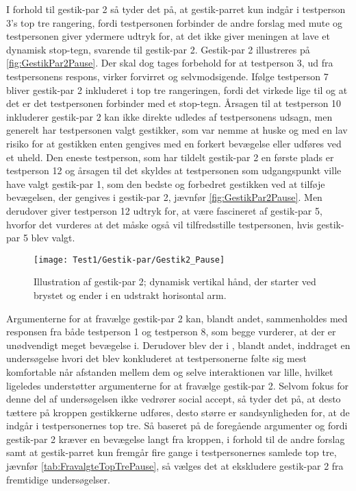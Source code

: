 \noindent
% 
I forhold til gestik-par 2 så tyder det på, at gestik-parret kun indgår i testperson 3's top tre rangering, fordi testpersonen forbinder de andre forslag med mute og testpersonen giver ydermere udtryk for, at det ikke giver meningen at lave et dynamisk stop-tegn, svarende til gestik-par 2. Gestik-par 2 illustreres på \autoref{fig:GestikPar2Pause}. Der skal dog tages forbehold for at testperson 3, ud fra testpersonens respons, virker forvirret og selvmodsigende. Ifølge testperson 7 bliver gestik-par 2 inkluderet i top tre rangeringen, fordi det virkede lige til og at det er det testpersonen forbinder med et stop-tegn. Årsagen til at testperson 10 inkluderer gestik-par 2 kan ikke direkte udledes af testpersonens udsagn, men generelt har testpersonen valgt gestikker, som var nemme at huske og med en lav risiko for at gestikken enten gengives med en forkert bevægelse eller udføres ved et uheld. Den eneste testperson, som har tildelt gestik-par 2 en første plads er testperson 12 og årsagen til det skyldes at testpersonen som udgangspunkt ville have valgt gestik-par 1, som den bedste og forbedret gestikken ved at tilføje bevægelsen, der gengives i gestik-par 2, jævnfør \autoref{fig:GestikPar2Pause}. Men derudover giver testperson 12 udtryk for, at være fascineret af gestik-par 5, hvorfor det vurderes at det måske også vil tilfredsstille testpersonen, hvis gestik-par 5 blev valgt. 
%
\begin{figure}[H]
	\centering
	\texttt{[image: Test1/Gestik-par/Gestik2\_Pause]}
	\caption{Illustration af gestik-par 2; dynamisk vertikal hånd, der starter ved brystet og ender i en udstrakt horisontal arm.}
	\label{fig:GestikPar2Pause}
\end{figure}
\noindent
% 
Argumenterne for at fravælge gestik-par 2 kan, blandt andet, sammenholdes med responsen fra både testperson 1 og testperson 8, som begge vurderer, at der er unødvendigt meget bevægelse i. Derudover blev der i , blandt andet, inddraget en undersøgelse hvori det blev konkluderet at testpersonerne følte sig mest komfortable når afstanden mellem dem og selve interaktionen var lille, hvilket ligeledes understøtter argumenterne for at fravælge gestik-par 2. Selvom fokus for denne del af undersøgelsen ikke vedrører social accept, så tyder det på, at desto tættere på kroppen gestikkerne udføres, desto større er sandsynligheden for, at de indgår i testpersonernes top tre. Så baseret på de foregående argumenter og fordi gestik-par 2 kræver en bevægelse langt fra kroppen, i forhold til de andre forslag samt at gestik-parret kun fremgår fire gange i testpersonernes samlede top tre, jævnfør \autoref{tab:FravalgteTopTrePause}, så vælges det at ekskludere gestik-par 2 fra fremtidige undersøgelser. 
%
